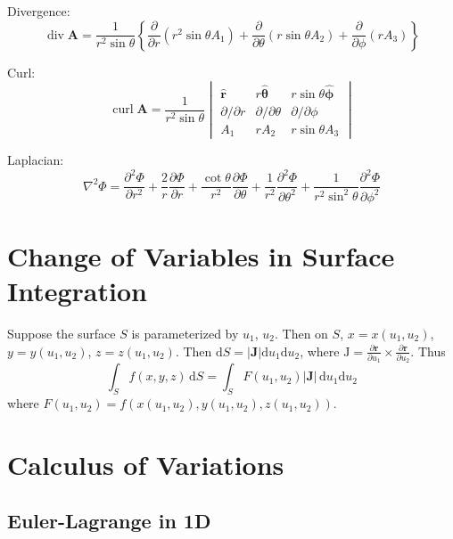 \documentclass{article}
\theoremstyle{definition}
\theoremstyle{definition}
\theoremstyle{remark}
\newcommand{\vecr}{\mathbf{r}}
\newcommand{\vecA}{\mathbf{A}}
\newcommand{\bhat}[1]{\mathbf{\hat{#1}}}
\DeclareMathOperator{\vdiv}{div}
\DeclareMathOperator{\vcurl}{curl}
\begin{document}
\noindent Divergence:
\begin{equation*}
    \vdiv \vecA = \frac{1}{r^2 \sin \theta} \left\{ \frac{\partial}{\partial r} (r^2 \sin \theta A_1) + \frac{\partial}{\partial \theta} (r \sin \theta A_2) + \frac{\partial}{\partial \phi} (r A_3) \right\}
\end{equation*}

\noindent Curl:
\begin{equation*}
    \vcurl \vecA = \frac{1}{r^2 \sin \theta}
    \begin{vmatrix}
        \bhat{r} & r \bhat{\theta} & r \sin \theta \bhat{\phi} \\
        \partial / \partial r & \partial / \partial \theta & \partial / \partial \phi \\
        A_1 & r A_2 & r \sin \theta A_3
    \end{vmatrix}
\end{equation*}

\noindent Laplacian:
\begin{equation*}
    \nabla^2 \Phi = \frac{\partial^2 \Phi}{\partial r^2} + \frac{2}{r} \frac{\partial \Phi}{\partial r} + \frac{\cot \theta}{r^2} \frac{\partial \Phi}{\partial \theta} + \frac{1}{r^2} \frac{\partial^2 \Phi}{\partial \theta^2} + \frac{1}{r^2 \sin^2 \theta} \frac{\partial^2 \Phi}{\partial \phi^2}
\end{equation*}

\section{Change of Variables in Surface Integration}
Suppose the surface $S$ is parameterized by $u_1$, $u_2$. Then on $S$, $x = x(u_1, u_2)$, $y = y(u_1, u_2)$, $z = z(u_1, u_2)$. Then $\mathrm{d}S = \lvert \mathbf{J} \rvert \mathrm{d}u_1 \mathrm{d}u_2$, where $\mathrm{J} = \frac{\partial \vecr}{\partial u_1} \times \frac{\partial \vecr}{\partial u_2}$. Thus
\begin{equation*}
    \int_S f(x, y, z) \,\mathrm{d}S = \int_S F(u_1, u_2) \lvert \mathbf{J} \rvert \,\mathrm{d}u_1 \mathrm{d}u_2
\end{equation*}
where $F(u_1, u_2) = f(x(u_1, u_2), y(u_1, u_2), z(u_1, u_2))$.

\section{Calculus of Variations}

\subsection{Euler-Lagrange in 1D}
\end{document}

